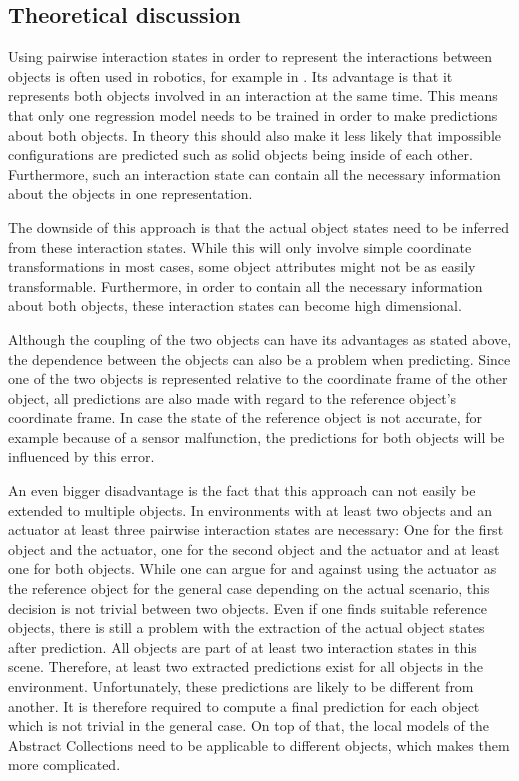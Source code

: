 \subsection{Theoretical discussion}
Using pairwise interaction states in order to represent the interactions between objects is often used in robotics, for example in \cite{pairwiseExamples}. Its advantage is that it represents both objects involved in an interaction at the same time. This means that only one regression model needs to be trained in order to make predictions about both objects. In theory this should also make it less likely that impossible configurations are predicted such as solid objects being inside of each other. Furthermore, such an interaction state can contain all the necessary information about the objects in one representation. 

The downside of this approach is that the actual object states need to be inferred from these interaction states. While this will only involve simple coordinate transformations in most cases, some object attributes might not be as easily transformable. Furthermore, in order to contain all the necessary information about both objects, these interaction states can become high dimensional. 

Although the coupling of the two objects can have its advantages as stated above, the dependence between the objects can also be a problem when predicting. Since one of the two objects is represented relative to the coordinate frame of the other object, all predictions are also made with regard to the reference object's coordinate frame. In case the state of the reference object is not accurate, for example because of a sensor malfunction, the predictions for both objects will be influenced by this error. 

An even bigger disadvantage is the fact that this approach can not easily be extended to multiple objects. In environments with at least two objects and an actuator at least three pairwise interaction states are necessary: One for the first object and the actuator, one for the second object and the actuator and at least one for both objects. While one can argue for and against using the actuator as the reference object for the general case depending on the actual scenario, this decision is not trivial between two objects. Even if one finds suitable reference objects, there is still a problem with the extraction of the actual object states after prediction. All objects are part of at least two interaction states in this scene. Therefore, at least two extracted predictions exist for all objects in the environment. Unfortunately, these predictions are likely to be different from another. It is therefore required to compute a final prediction for each object which is not trivial in the general case. On top of that, the local models of the Abstract Collections need to be applicable to different objects, which makes them more complicated.

